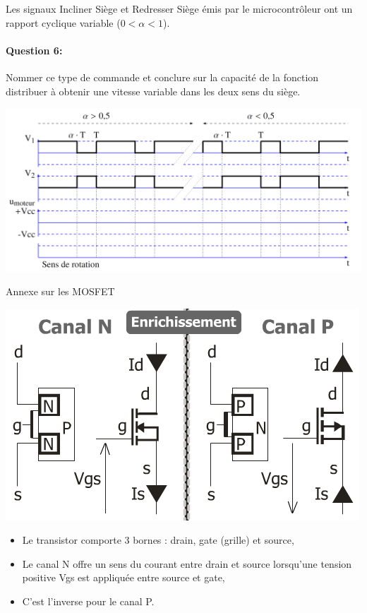 Les signaux \og Incliner Siège \fg et \og Redresser Siège \fg émis par le microcontrôleur ont un rapport cyclique variable ($0<\alpha<1$).

\paragraph{Question 6:} Nommer ce type de commande et conclure sur la capacité de la fonction \og distribuer \fg à obtenir une vitesse variable dans les deux sens du siège.

\begin{center}
 \includegraphics[width=0.9\linewidth]{img/doc_rep_chair}
\end{center}

Annexe sur les MOSFET

\begin{center}
 \includegraphics[width=0.7\linewidth]{img/mofset}
\end{center}

\begin{itemize}
 \item Le transistor comporte 3 bornes : drain, gate (grille) et source,
 \item Le canal N offre un sens du courant entre drain et source lorsqu'une tension positive Vgs est appliquée entre source et gate,
 \item C'est l'inverse pour le canal P.
\end{itemize}

